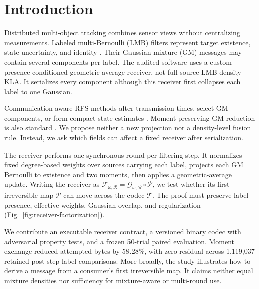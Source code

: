 \section{Introduction}
\label{sec:introduction}

Distributed multi-object tracking combines sensor views without centralizing
measurements. Labeled multi-Bernoulli (LMB) filters represent target existence,
state uncertainty, and identity
\cite{Vo2014LRFS,Reuter2014LMB,Vo2019MSGLMB}. Their Gaussian-mixture (GM)
messages may contain several components per label. The audited software uses a
custom presence-conditioned geometric-average receiver, not full-source
LMB-density KLA. It serializes every component although this receiver first
collapses each label to one Gaussian.

Communication-aware RFS methods alter transmission times, select GM components,
or form compact state estimates
\cite{Shen2022EventTriggeredLMB,Li2023EventTriggeredConsensusLMB,
Li2019PartialConsensusGMPHD,Xue2026StateCovProjection}. Moment-preserving GM
reduction is also standard \cite{Runnalls2007GMR}. We propose neither a new
projection nor a density-level fusion rule. Instead, we ask which fields can
affect a fixed receiver after serialization.

The receiver performs one synchronous round per filtering step. It normalizes
fixed degree-based weights over sources carrying each label, projects each GM
Bernoulli to existence and two moments, then applies a geometric-average update.
Writing the receiver as
$\mathcal F_{\omega,\mathcal R}=\mathcal G_{\omega,\mathcal R}\circ\mathcal P$,
we test whether its first irreversible map $\mathcal P$ can move across the
codec $\mathcal T$. The proof must preserve label presence, effective weights,
Gaussian overlap, and regularization (Fig.~\ref{fig:receiver-factorization}).

We contribute an executable receiver contract, a versioned binary codec with
adversarial property tests, and a frozen 50-trial paired evaluation. Moment
exchange reduced attempted bytes by 58.28\%, with zero residual across 1,119,037
retained post-step label comparisons. More broadly, the study illustrates how
to derive a message from a consumer's first irreversible map. It claims neither
equal mixture densities nor sufficiency for mixture-aware or multi-round use.
